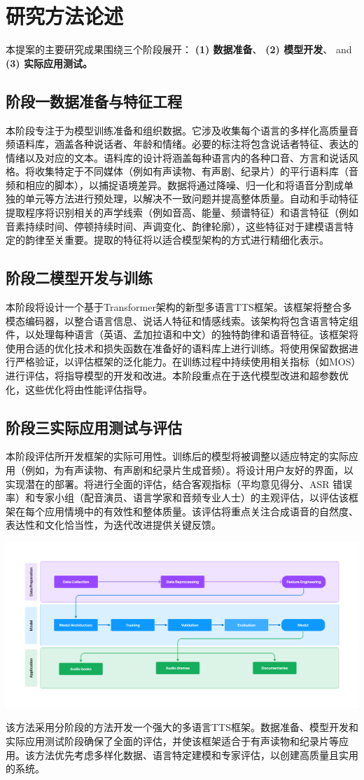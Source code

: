 \section*{研究方法论述}

本提案的主要研究成果围绕三个阶段展开： \textbf{(1) 数据准备}、 \textbf{(2) 模型开发}、 and \textbf{(3) 实际应用测试。}


\subsection*{阶段一数据准备与特征工程}
本阶段专注于为模型训练准备和组织数据。它涉及收集每个语言的多样化高质量音频语料库，涵盖各种说话者、年龄和情绪。必要的标注将包含说话者特征、表达的情绪以及对应的文本。语料库的设计将涵盖每种语言内的各种口音、方言和说话风格。将收集特定于不同媒体（例如有声读物、有声剧、纪录片）的平行语料库（音频和相应的脚本），以捕捉语境差异。数据将通过降噪、归一化和将语音分割成单独的单元等方法进行预处理，以解决不一致问题并提高整体质量。自动和手动特征提取程序将识别相关的声学线索（例如音高、能量、频谱特征）和语言特征（例如音素持续时间、停顿持续时间、声调变化、韵律轮廓），这些特征对于建模语言特定的韵律至关重要。提取的特征将以适合模型架构的方式进行精细化表示。

\subsection*{阶段二模型开发与训练}
本阶段将设计一个基于Transformer架构的新型多语言TTS框架。该框架将整合多模态编码器，以整合语言信息、说话人特征和情感线索。该架构将包含语言特定组件，以处理每种语言（英语、孟加拉语和中文）的独特韵律和语音特征。该框架将使用合适的优化技术和损失函数在准备好的语料库上进行训练。将使用保留数据进行严格验证，以评估框架的泛化能力。在训练过程中持续使用相关指标（如MOS）进行评估，将指导模型的开发和改进。本阶段重点在于迭代模型改进和超参数优化，这些优化将由性能评估指导。

\subsection*{ 阶段三实际应用测试与评估}
本阶段评估所开发框架的实际可用性。训练后的模型将被调整以适应特定的实际应用（例如，为有声读物、有声剧和纪录片生成音频）。将设计用户友好的界面，以实现潜在的部署。将进行全面的评估，结合客观指标（平均意见得分、ASR 错误率）和专家小组（配音演员、语言学家和音频专业人士）的主观评估，以评估该框架在每个应用情境中的有效性和整体质量。该评估将重点关注合成语音的自然度、表达性和文化恰当性，为迭代改进提供关键反馈。

\begin{center}
    \includegraphics[width=1.0\textwidth]{research-flow.png}
\end{center}

该方法采用分阶段的方法开发一个强大的多语言TTS框架。数据准备、模型开发和实际应用测试阶段确保了全面的评估，并使该框架适合于有声读物和纪录片等应用。该方法优先考虑多样化数据、语言特定建模和专家评估，以创建高质量且实用的系统。